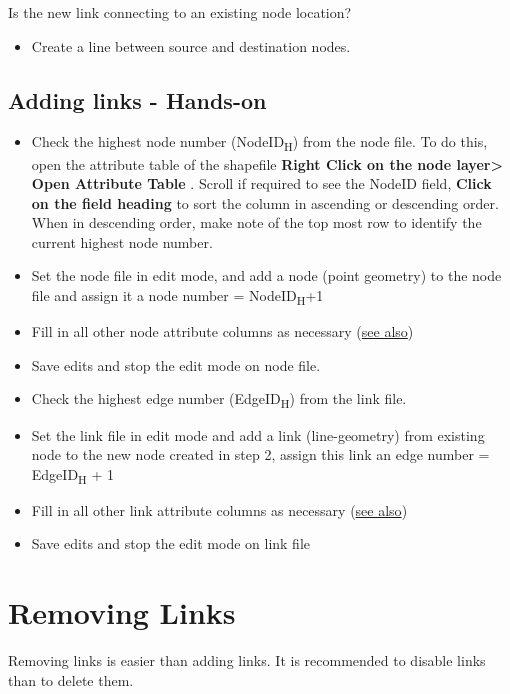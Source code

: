 \documentclass[
]{book}
\providecommand{\tightlist}{%
  \setlength{\itemsep}{0pt}\setlength{\parskip}{0pt}}
\begin{document}
Is the new link connecting to an existing node location?

\begin{itemize}
\tightlist
\item
  Create a line between source and destination nodes.
\end{itemize}

\section{Adding links - Hands-on}\label{adding-links---hands-on}

\begin{itemize}
\tightlist
\item
  Check the highest node number (NodeID\textsubscript{H}) from the node file. To do this, open the attribute table of the shapefile \textbf{Right Click on the node layer\textgreater{} Open Attribute Table} . Scroll if required to see the NodeID field, \textbf{Click on the field heading} to sort the column in ascending or descending order. When in descending order, make note of the top most row to identify the current highest node number.
\item
  Set the node file in edit mode, and add a node (point geometry) to the node file and assign it a node number = NodeID\textsubscript{H}+1
\item
  Fill in all other node attribute columns as necessary (\hyperref[modifying-node-attributes]{see also})
\item
  Save edits and stop the edit mode on node file.
\item
  Check the highest edge number (EdgeID\textsubscript{H}) from the link file.
\item
  Set the link file in edit mode and add a link (line-geometry) from existing node to the new node created in step 2, assign this link an edge number = EdgeID\textsubscript{H} + 1
\item
  Fill in all other link attribute columns as necessary (\hyperref[modifying-edge-attributes]{see also})
\item
  Save edits and stop the edit mode on link file
\end{itemize}

\chapter{Removing Links}\label{removing-links}

Removing links is easier than adding links. It is recommended to disable links than to delete them.
\end{document}
